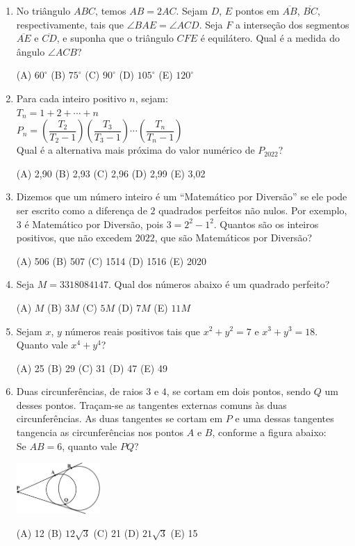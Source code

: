 \documentclass[12pt]{article}
\begin{document}
\begin{enumerate}[label=\textbf{{\arabic*.}}]
(A) 7,6 (B) 7,8 (C) 8 (D) 8,2 (E) 8,4

\item No triângulo $ABC$, temos $AB=2AC$. Sejam $D$, $E$ pontos em $\overline{AB}$, $\overline{BC}$, respectivamente, tais que $\angle BAE=\angle ACD$. Seja $F$ a interseção dos segmentos $\overline{AE}$ e $\overline{CD}$, e suponha que o triângulo $CFE$ é equilátero. Qual é a medida do ângulo $\angle ACB$?

(A) $60^\circ$ (B) $75^\circ$ (C) $90^\circ$ (D) $105^\circ$ (E) $120^\circ$

\item Para cada inteiro positivo $n$, sejam: \\
$T_n = 1 + 2 + \cdots + n$ \\
$P_n = \left(\dfrac{T_2}{T_2 - 1}\right)\left(\dfrac{T_3}{T_3 - 1}\right)\cdots\left(\dfrac{T_n}{T_n - 1}\right)$ \\
Qual é a alternativa mais próxima do valor numérico de $P_{2022}$?

(A) 2,90 (B) 2,93 (C) 2,96 (D) 2,99 (E) 3,02

\item Dizemos que um número inteiro é um “Matemático por Diversão” se ele pode ser escrito como a diferença de $2$ quadrados perfeitos não nulos. Por exemplo, $3$ é Matemático por Diversão, pois $3=2^2-1^2$. Quantos são os inteiros positivos, que não excedem $2022$, que são Matemáticos por Diversão?

(A) 506 (B) 507 (C) 1514 (D) 1516 (E) 2020

\item Seja $M=3318084147$. Qual dos números abaixo é um quadrado perfeito?

(A) $M$ (B) $3M$ (C) $5M$ (D) $7M$ (E) $11M$

\item Sejam $x$, $y$ números reais positivos tais que $x^2+y^2=7$ e $x^3+y^3=18$. Quanto vale $x^4+y^4$?

(A) 25 (B) 29 (C) 31 (D) 47 (E) 49

\item Duas circunferências, de raios $3$ e $4$, se cortam em dois pontos, sendo $Q$ um desses pontos. Traçam-se as tangentes externas comuns às duas circunferências. As duas tangentes se cortam em $P$ e uma dessas tangentes tangencia as circunferências nos pontos $A$ e $B$, conforme a figura abaixo: \\
Se $AB=6$, quanto vale $PQ$?

  \begin{center}
  \includegraphics[width=0.25\textwidth]{fifth.png}
\end{center}


(A) 12 (B) $12\sqrt{3}$ (C) 21 (D) $21\sqrt{3}$ (E) 15

    \end{enumerate}
\end{document}
